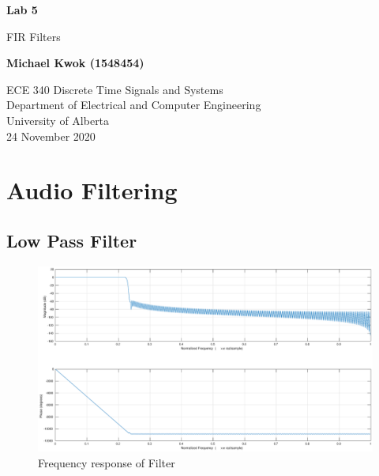 \documentclass{article}
\begin{document}
\begin{titlepage}
    \begin{center}
        \vspace*{1cm}

        \huge{\textbf{Lab 5}}

        \vspace{0.5cm}

        \LARGE{FIR Filters}
        \vspace{5cm}

        \Large{\textbf{Michael Kwok (1548454)}}

        \vfill
        ECE 340 Discrete Time Signals and Systems\\
        Department of Electrical and Computer Engineering\\
        University of Alberta\\
        24 November 2020
    \end{center}
\end{titlepage}
\section{Audio Filtering}

\subsection{Low Pass Filter}

\begin{figure}[H]
    \centering
    \includegraphics[width=\textwidth]{hamming_lps}
    \caption{Frequency response of Filter}
    \label{fig:filt1}
\end{figure}
\end{document}
